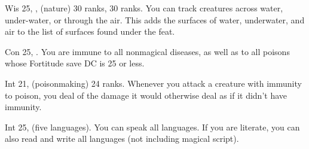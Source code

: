 {Wis 25, ,  (nature) 30 ranks,  30 ranks.}
{You can track creatures across water, under-water, or through the air. This adds the surfaces of water, underwater, and air to the list of surfaces found under the  feat.}


{Con 25, .}
{You are immune to all nonmagical diseases, as well as to all poisons whose Fortitude save DC is 25 or less.}

{Int 21,  (poisonmaking) 24 ranks.}
{Whenever you attack a creature with immunity to poison, you deal \onehalf of the damage it would otherwise deal as if it didn't have immunity.}

{Int 25,  (five languages).}
{You can speak all languages. If you are literate, you can also read and write all languages (not including magical script).}




